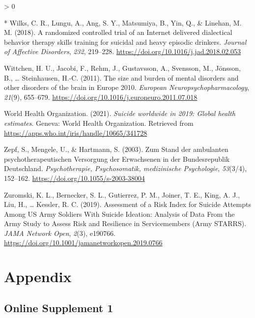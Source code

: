 \documentclass[
  english,
  man]{apa6}
\newlength{\cslhangindent}
\newenvironment{CSLReferences}[2] %
 {%
  \setlength{\parindent}{0pt}
  \ifodd #1 \everypar{\setlength{\hangindent}{\cslhangindent}}\ignorespaces\fi
  \ifnum #2 > 0
  \setlength{\parskip}{#2\baselineskip}
  \fi
 }%
 {}
\begin{document}
\begin{CSLReferences}{1}{0}
\leavevmode\hypertarget{ref-wilks2018}{}%
* Wilks, C. R., Lungu, A., Ang, S. Y., Matsumiya, B., Yin, Q., \& Linehan, M. M. (2018). A randomized controlled trial of an {Internet} delivered dialectical behavior therapy skills training for suicidal and heavy episodic drinkers. \emph{Journal of Affective Disorders}, \emph{232}, 219--228. \url{https://doi.org/10.1016/j.jad.2018.02.053}

\leavevmode\hypertarget{ref-wittchen2011a}{}%
Wittchen, H. U., Jacobi, F., Rehm, J., Gustavsson, A., Svensson, M., Jönsson, B., \ldots{} Steinhausen, H.-C. (2011). The size and burden of mental disorders and other disorders of the brain in {Europe} 2010. \emph{European Neuropsychopharmacology}, \emph{21}(9), 655--679. \url{https://doi.org/10.1016/j.euroneuro.2011.07.018}

\leavevmode\hypertarget{ref-worldhealthorganization2021}{}%
World Health Organization. (2021). \emph{Suicide worldwide in 2019: Global health estimates}. {Geneva}: {World Health Organization}. Retrieved from \url{https://apps.who.int/iris/handle/10665/341728}

\leavevmode\hypertarget{ref-zepf2003}{}%
Zepf, S., Mengele, U., \& Hartmann, S. (2003). Zum Stand der ambulanten psychotherapeutischen Versorgung der Erwachsenen in der Bundesrepublik Deutschland. \emph{Psychotherapie, Psychosomatik, medizinische Psychologie}, \emph{53}(3/4), 152--162. \url{https://doi.org/10.1055/s-2003-38004}

\leavevmode\hypertarget{ref-zuromski2019}{}%
Zuromski, K. L., Bernecker, S. L., Gutierrez, P. M., Joiner, T. E., King, A. J., Liu, H., \ldots{} Kessler, R. C. (2019). Assessment of a {Risk Index} for {Suicide Attempts Among US Army Soldiers With Suicide Ideation}: Analysis of {Data From} the {Army Study} to {Assess Risk} and {Resilience} in {Servicemembers} ({Army STARRS}). \emph{JAMA Network Open}, \emph{2}(3), e190766. \url{https://doi.org/10.1001/jamanetworkopen.2019.0766}

\end{CSLReferences}

\endgroup

\hypertarget{appendix}{%
\section{Appendix}\label{appendix}}

\hypertarget{online-supplement-1}{%
\subsection{Online Supplement 1}\label{online-supplement-1}}
\end{document}
